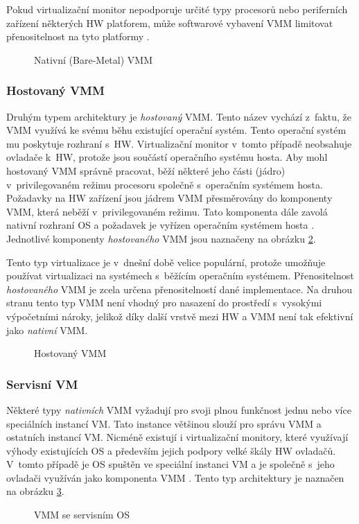 Pokud virtualizační monitor nepodporuje určité typy procesorů nebo periferních zařízení některých HW platforem, může softwarové
vybavení VMM limitovat přenositelnost na tyto platformy \cite{cvut:presentation:virt1}.
\begin{figure}
    \centering    
    \caption{Nativní (Bare-Metal) VMM}
    \label{figure:native_vmm}
\end{figure}
\subsubsection{Hostovaný VMM}
\label{chapter:virtualization:vmm:types:hosted}
Druhým typem architektury je \textit{hostovaný} VMM. Tento název vychází z~faktu, že VMM využívá ke svému běhu existující operační
systém. Tento operační systém mu poskytuje rozhraní s~HW. Virtualizační monitor v~tomto případě neobsahuje ovladače k~HW,
protože jsou součástí operačního systému hosta. Aby mohl hostovaný VMM správně pracovat, běží některé jeho části (jádro)
v~privilegovaném režimu procesoru společně s~operačním systémem hosta. Požadavky na HW zařízení jsou jádrem VMM přesměrovány
do komponenty VMM, která neběží v~privilegovaném režimu. Tato komponenta dále zavolá nativní rozhraní OS a požadavek je 
vyřízen operačním systémem hosta \cite{cvut:presentation:virt1}. Jednotlivé komponenty \textit{hostovaného} VMM jsou naznačeny na 
obrázku \ref{figure:hosted_vmm}.

Tento typ virtualizace je v~dnešní době velice populární, protože umožňuje používat virtualizaci na systémech s~běžícím operačním 
systémem. Přenositelnost \textit{hostovaného} VMM je zcela určena přenositelností dané implementace. Na druhou stranu tento
typ VMM není vhodný pro nasazení do prostředí s~vysokými výpočetními nároky, jelikož díky další vrstvě mezi HW a VMM není tak
efektivní jako \textit{nativní} VMM.
\begin{figure}
    \centering    
    \caption{Hostovaný VMM}
    \label{figure:hosted_vmm}
\end{figure}
\subsubsection{Servisní VM}
\label{chapter:virtualization:vmm:types:servise}
Některé typy \textit{nativních} VMM vyžadují pro svoji plnou funkčnost jednu nebo více speciálních instancí VM. Tato instance
většinou slouží pro správu VMM a ostatních instancí VM. Nicméně existují i virtualizační monitory, které využívají výhody
existujících OS a především jejich podpory velké škály HW ovladačů. V~tomto případě je OS spuštěn ve speciální instanci VM
a je společně s~jeho ovladači využíván jako komponenta VMM \cite{cvut:presentation:virt11}. Tento typ architektury je naznačen
na obrázku \ref{figure:servise_vmm}.
\begin{figure}
    \centering    
    \caption{VMM se servisním OS}
    \label{figure:servise_vmm}
\end{figure}